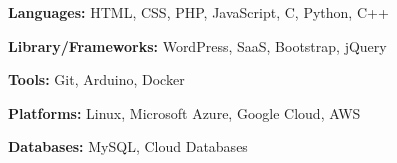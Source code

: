 \textbf{Languages:} HTML, CSS, PHP, JavaScript, C, Python, C++

\textbf{Library/Frameworks:} WordPress, SaaS, Bootstrap, jQuery 

\textbf{Tools:} Git, Arduino, Docker

\textbf{Platforms:} Linux, Microsoft Azure, Google Cloud, AWS

\textbf{Databases:} MySQL, Cloud Databases